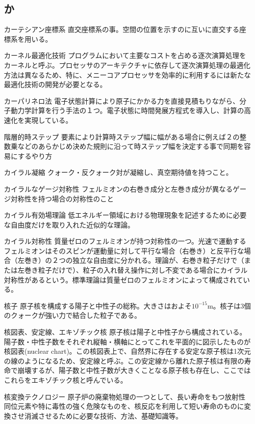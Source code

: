 \begin{用語集}
\section{か}
\item{カーテシアン座標系}{}
{直交座標系の事。空間の位置を示すのに互いに直交する座標系を用いる。}
\item{カーネル最適化技術}{}
{プログラムにおいて主要なコストを占める逐次演算処理をカーネルと呼ぶ。プロセッサのアーキテクチャに依存して逐次演算処理の最適化方法は異なるため、特に、メニーコアプロセッサを効率的に利用するには新たな最適化技術の開発が必要となる。}
\item{カーパリネロ法}{}
{電子状態計算により原子にかかる力を直接見積もりながら、分子動力学計算を行う手法の１つ。電子状態に時間発展方程式を導入し、計算の高速化を実現している。}
\item{階層的時ステップ}{}
{要素により計算時ステップ幅に幅がある場合に例えば２の整数乗などのあらかじめ決めた規則に沿って時ステップ幅を決定する事で同期を容易にするやり方}
\item{カイラル凝縮}{}
{クォーク・反クォーク対が凝縮し、真空期待値を持つこと。}
\item{カイラルなゲージ対称性}{}
{フェルミオンの右巻き成分と左巻き成分が異なるゲージ対称性を持つ場合の対称性のこと}
\item{カイラル有効場理論}{}
{低エネルギー領域における物理現象を記述するために必要な自由度だけを取り入れた近似的な理論。}
\item{カイラル対称性}{}
{質量ゼロのフェルミオンが持つ対称性の一つ。光速で運動するフェルミオンはそのスピンが運動量に対して平行な場合（右巻き）と反平行な場合（左巻き）の２つの独立な自由度に分かれる。理論が、右巻き粒子だけで（または左巻き粒子だけで）、粒子の入れ替え操作に対し不変である場合にカイラル対称性があるという。標準理論は質量ゼロのフェルミオンによって構成されている。}
\item{核子}{}
{原子核を構成する陽子と中性子の総称。大きさはおよそ$10^{-15}$m。核子は3個のクォークが強い力で結合した粒子である。}
\item{核図表、安定線、エキゾチック核}{}
{原子核は陽子と中性子から構成されている。陽子数・中性子数をそれぞれ縦軸・横軸にとってこれを平面的に図示したものが核図表(nuclear chart)。この核図表上で、自然界に存在する安定な原子核は1次元の線のようになるため、安定線と呼ぶ。この安定線から離れた原子核は有限の寿命で崩壊するが、陽子数と中性子数が大きくことなる原子核も存在し、ここではこれらをエキゾチック核と呼んでいる。}
\item{核変換テクノロジー}{}
{原子炉の廃棄物処理の一つとして、長い寿命をもつ放射性同位元素や特に毒性の強く危険なものを、核反応を利用して短い寿命のものに変換させ消滅させるために必要な技術、方法、基礎知識等。}

\end{用語集}

